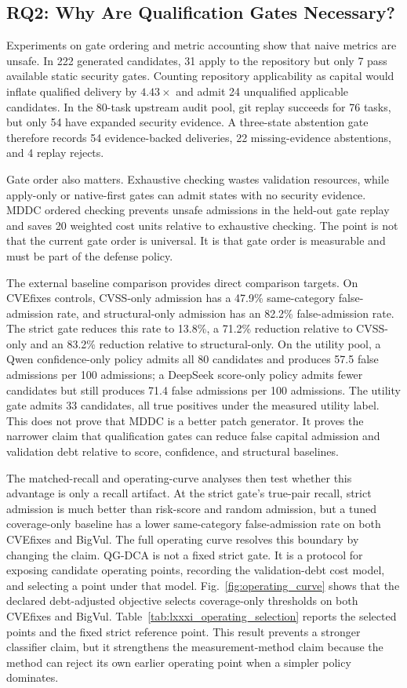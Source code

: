 ﻿\documentclass[lettersize,journal]{IEEEtran}
\begin{document}
\subsection{RQ2: Why Are Qualification Gates Necessary?}
Experiments on gate ordering and metric accounting show that naive metrics are unsafe. In 222 generated candidates, 31 apply to the repository but only 7 pass available static security gates. Counting repository applicability as capital would inflate qualified delivery by $4.43\times$ and admit 24 unqualified applicable candidates. In the 80-task upstream audit pool, git replay succeeds for 76 tasks, but only 54 have expanded security evidence. A three-state abstention gate therefore records 54 evidence-backed deliveries, 22 missing-evidence abstentions, and 4 replay rejects.

Gate order also matters. Exhaustive checking wastes validation resources, while apply-only or native-first gates can admit states with no security evidence. MDDC ordered checking prevents unsafe admissions in the held-out gate replay and saves 20 weighted cost units relative to exhaustive checking. The point is not that the current gate order is universal. It is that gate order is measurable and must be part of the defense policy.

The external baseline comparison provides direct comparison targets. On CVEfixes controls, CVSS-only admission has a 47.9\% same-category false-admission rate, and structural-only admission has an 82.2\% false-admission rate. The strict gate reduces this rate to 13.8\%, a 71.2\% reduction relative to CVSS-only and an 83.2\% reduction relative to structural-only. On the utility pool, a Qwen confidence-only policy admits all 80 candidates and produces 57.5 false admissions per 100 admissions; a DeepSeek score-only policy admits fewer candidates but still produces 71.4 false admissions per 100 admissions. The utility gate admits 33 candidates, all true positives under the measured utility label. This does not prove that MDDC is a better patch generator. It proves the narrower claim that qualification gates can reduce false capital admission and validation debt relative to score, confidence, and structural baselines.

The matched-recall and operating-curve analyses then test whether this advantage is only a recall artifact. At the strict gate's true-pair recall, strict admission is much better than risk-score and random admission, but a tuned coverage-only baseline has a lower same-category false-admission rate on both CVEfixes and BigVul. The full operating curve resolves this boundary by changing the claim. QG-DCA is not a fixed strict gate. It is a protocol for exposing candidate operating points, recording the validation-debt cost model, and selecting a point under that model. Fig.~\ref{fig:operating_curve} shows that the declared debt-adjusted objective selects coverage-only thresholds on both CVEfixes and BigVul. Table~\ref{tab:lxxxi_operating_selection} reports the selected points and the fixed strict reference point. This result prevents a stronger classifier claim, but it strengthens the measurement-method claim because the method can reject its own earlier operating point when a simpler policy dominates.
\end{document}

